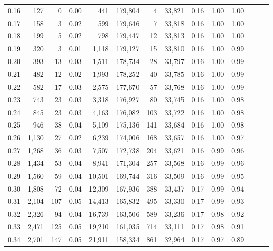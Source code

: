 \begin{tabular}{rrrrrrrrrrrrrr}
0.16 &    127 &      0 &  0.00 &      441 &  179,804 &       4 &  33,821 &  0.16 &  1.00 &      1.00 \\
0.17 &    158 &      3 &  0.02 &      599 &  179,646 &       7 &  33,818 &  0.16 &  1.00 &      1.00 \\
0.18 &    199 &      5 &  0.02 &      798 &  179,447 &      12 &  33,813 &  0.16 &  1.00 &      1.00 \\
0.19 &    320 &      3 &  0.01 &    1,118 &  179,127 &      15 &  33,810 &  0.16 &  1.00 &      0.99 \\
0.20 &    393 &     13 &  0.03 &    1,511 &  178,734 &      28 &  33,797 &  0.16 &  1.00 &      0.99 \\
0.21 &    482 &     12 &  0.02 &    1,993 &  178,252 &      40 &  33,785 &  0.16 &  1.00 &      0.99 \\
0.22 &    582 &     17 &  0.03 &    2,575 &  177,670 &      57 &  33,768 &  0.16 &  1.00 &      0.99 \\
0.23 &    743 &     23 &  0.03 &    3,318 &  176,927 &      80 &  33,745 &  0.16 &  1.00 &      0.98 \\
0.24 &    845 &     23 &  0.03 &    4,163 &  176,082 &     103 &  33,722 &  0.16 &  1.00 &      0.98 \\
0.25 &    946 &     38 &  0.04 &    5,109 &  175,136 &     141 &  33,684 &  0.16 &  1.00 &      0.98 \\
0.26 &  1,130 &     27 &  0.02 &    6,239 &  174,006 &     168 &  33,657 &  0.16 &  1.00 &      0.97 \\
0.27 &  1,268 &     36 &  0.03 &    7,507 &  172,738 &     204 &  33,621 &  0.16 &  0.99 &      0.96 \\
0.28 &  1,434 &     53 &  0.04 &    8,941 &  171,304 &     257 &  33,568 &  0.16 &  0.99 &      0.96 \\
0.29 &  1,560 &     59 &  0.04 &   10,501 &  169,744 &     316 &  33,509 &  0.16 &  0.99 &      0.95 \\
0.30 &  1,808 &     72 &  0.04 &   12,309 &  167,936 &     388 &  33,437 &  0.17 &  0.99 &      0.94 \\
0.31 &  2,104 &    107 &  0.05 &   14,413 &  165,832 &     495 &  33,330 &  0.17 &  0.99 &      0.93 \\
0.32 &  2,326 &     94 &  0.04 &   16,739 &  163,506 &     589 &  33,236 &  0.17 &  0.98 &      0.92 \\
0.33 &  2,471 &    125 &  0.05 &   19,210 &  161,035 &     714 &  33,111 &  0.17 &  0.98 &      0.91 \\
0.34 &  2,701 &    147 &  0.05 &   21,911 &  158,334 &     861 &  32,964 &  0.17 &  0.97 &      0.89 \\

\end{tabular}
